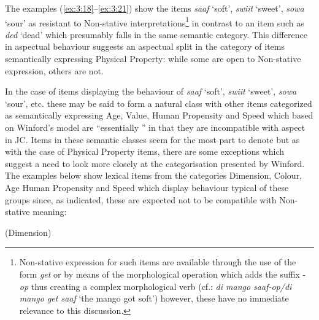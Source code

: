 
 \z \z

The examples (\ref{ex:3:18}--\ref{ex:3:21}) show the items
\textit{saaf} `soft', \textit{swiit} `sweet', \textit{sowa} `sour’ as
resistant to Non-stative interpretations\footnote{Non-stative
  expression for such items are available through the use of the
   form \textit{get} or by means of the morphological
  operation which adds the suffix -\textit{op} thus creating a complex
  morphological verb (cf.: \textit{di mango saaf-op\slash di mango get
    saaf} `the mango got soft') however, these have no immediate
  relevance to this discussion.} in contrast to an item such as
\textit{ded}  `dead' which presumably falls in the same semantic
category.  This difference in aspectual behaviour suggests an
aspectual split in the category of items semantically expressing
Physical Property: while some are open to Non-stative expression,
others are not.

In the case of items displaying the behaviour of \textit{saaf} `soft',
\textit{swiit} `sweet', \textit{sowa} `sour',  etc. these may be said to
form a natural class with other items categorized as semantically
expressing Age, Value, Human Propensity and Speed which based on
Winford’s model are ``essentially ” in that they are
incompatible with  aspect in JC.  Items in these semantic classes seem for the most part to denote  but as with the case of Physical Property items, there are some exceptions which
suggest a need to look more closely at the categorisation presented by
Winford. The examples below show lexical items from the categories
Dimension, Colour, Age Human Propensity and Speed which display
behaviour typical of these groups since, as indicated, these are
expected not to be compatible with Non-stative meaning:

\ea%
\label{ex:3:22}
(Dimension)  \\



